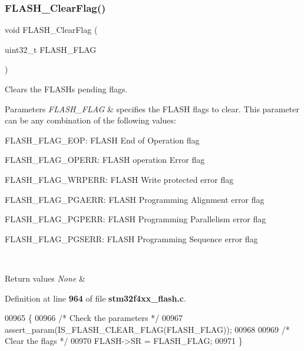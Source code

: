 \subsubsection{F\+L\+A\+S\+H\+\_\+\+Clear\+Flag()}
{\footnotesize\ttfamily void F\+L\+A\+S\+H\+\_\+\+Clear\+Flag (\begin{DoxyParamCaption}\item[{uint32\+\_\+t}]{F\+L\+A\+S\+H\+\_\+\+F\+L\+AG }\end{DoxyParamCaption})}



Clears the F\+L\+A\+SH\textquotesingle{}s pending flags. 


\begin{DoxyParams}{Parameters}
{\em F\+L\+A\+S\+H\+\_\+\+F\+L\+AG} & specifies the F\+L\+A\+SH flags to clear. This parameter can be any combination of the following values\+: \begin{DoxyItemize}
\item F\+L\+A\+S\+H\+\_\+\+F\+L\+A\+G\+\_\+\+E\+OP\+: F\+L\+A\+SH End of Operation flag \item F\+L\+A\+S\+H\+\_\+\+F\+L\+A\+G\+\_\+\+O\+P\+E\+RR\+: F\+L\+A\+SH operation Error flag \item F\+L\+A\+S\+H\+\_\+\+F\+L\+A\+G\+\_\+\+W\+R\+P\+E\+RR\+: F\+L\+A\+SH Write protected error flag \item F\+L\+A\+S\+H\+\_\+\+F\+L\+A\+G\+\_\+\+P\+G\+A\+E\+RR\+: F\+L\+A\+SH Programming Alignment error flag \item F\+L\+A\+S\+H\+\_\+\+F\+L\+A\+G\+\_\+\+P\+G\+P\+E\+RR\+: F\+L\+A\+SH Programming Parallelism error flag \item F\+L\+A\+S\+H\+\_\+\+F\+L\+A\+G\+\_\+\+P\+G\+S\+E\+RR\+: F\+L\+A\+SH Programming Sequence error flag \end{DoxyItemize}
\\
\hline
\end{DoxyParams}

\begin{DoxyRetVals}{Return values}
{\em None} & \\
\hline
\end{DoxyRetVals}


Definition at line \textbf{ 964} of file \textbf{ stm32f4xx\+\_\+flash.\+c}.


\begin{DoxyCode}
00965 \{
00966   \textcolor{comment}{/* Check the parameters */}
00967   assert_param(IS_FLASH_CLEAR_FLAG(FLASH\_FLAG));
00968   
00969   \textcolor{comment}{/* Clear the flags */}
00970   FLASH->SR = FLASH\_FLAG;
00971 \}
\end{DoxyCode}
\mbox{\label{group__FLASH_ga937a824493f3c6949289401a767a0360}} 
